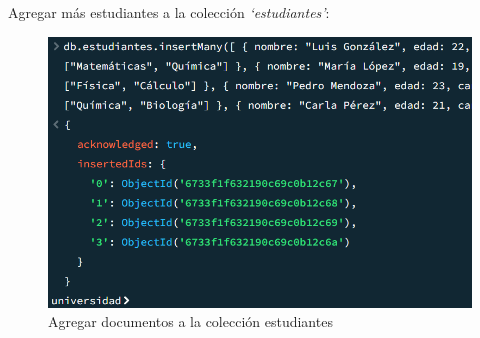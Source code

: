 Agregar más estudiantes a la colección \emph{`estudiantes'}:

\begin{figure}[H]
  \centering
  \includegraphics[scale = 0.6]{Imagenes/parte2/2.1.png}
  \caption{Agregar documentos a la colección estudiantes}
\end{figure}